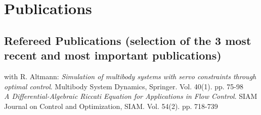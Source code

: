 \documentclass[11pt, a4paper]{article} %
\newcommand{\years}[1]{\marginnote{\scriptsize #1}} %
\begin{document}
\section*{Publications}

\vspace{.1in}
\subsection*{Refereed Publications (selection of the 3 most recent and most important publications)}
\years{2017} with R. Altmann: \emph{Simulation of multibody systems with servo constraints through optimal control}. Multibody System Dynamics, Springer. Vol. 40(1). pp. 75-98\\


\years{2016} \emph{A Differential-Algebraic Riccati Equation for Applications in Flow Control}. SIAM Journal on Control and Optimization, SIAM. Vol. 54(2). pp. 718-739\\
\end{document}
